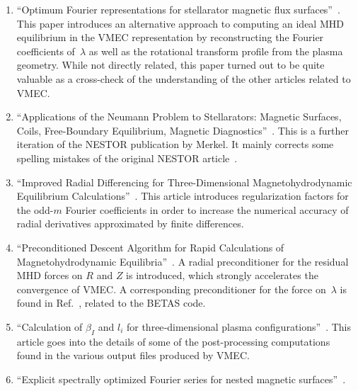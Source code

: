 \documentclass[a4paper,11pt]{book}
\begin{document}
\begin{enumerate}
       the corresponding ORNL report is~\cite{ornl_tm_10412_attenberger_houlberg_hirshman_1987}.
       This article introduces several important post-processing methods
       commonly used on VMEC equilibria: an inverse coordinate transform
       from real space back into VMEC's flux coordinates,
       evaluation of the cylindrical components of the magnetic field,
       and tracking a line-of-sight through the plasma.
 \item ``Optimum Fourier representations for stellarator magnetic flux surfaces''~\cite{lee_1988}.
       This paper introduces an alternative approach to computing an ideal MHD equilibrium
       in the VMEC representation by reconstructing the Fourier coefficients of~$\lambda$
       as well as the rotational transform profile from the plasma geometry.
       While not directly related, this paper turned out to be quite valuable
       as a cross-check of the understanding of the other articles related to VMEC.
 \item ``Applications of the Neumann Problem to Stellarators: Magnetic Surfaces, Coils, Free-Boundary Equilibrium, Magnetic Diagnostics''~\cite{merkel_1988}.
       This is a further iteration of the NESTOR publication by Merkel.
       It mainly corrects some spelling mistakes of the original NESTOR article~\cite{merkel_1986}.
 \item ``Improved Radial Differencing for Three-Dimensional Magnetohydrodynamic Equilibrium Calculations''~\cite{hirshman_schwenn_nuehrenberg_1990}.
       This article introduces regularization factors for the odd-$m$ Fourier coefficients
       in order to increase the numerical accuracy of radial derivatives approximated by finite differences.
 \item ``Preconditioned Descent Algorithm for Rapid Calculations of Magnetohydrodynamic Equilibria''~\cite{hirshman_betancourt_1991}.
       A radial preconditioner for the residual MHD forces on $R$ and $Z$ is introduced,
       which strongly accelerates the convergence of VMEC.
       A corresponding preconditioner for the force on~$\lambda$ is found in Ref.~\cite{betancourt_1988_betas},
       related to the BETAS code.
 \item ``Calculation of $\beta_I$ and $l_i$ for three‐dimensional plasma configurations''~\cite{hirshman_1993}.
       This article goes into the details of some of the post-processing computations
       found in the various output files produced by VMEC.
 \item ``Explicit spectrally optimized Fourier series for nested magnetic surfaces''~\cite{hirshman_breslau_1998}.

\end{enumerate}
\end{document}
